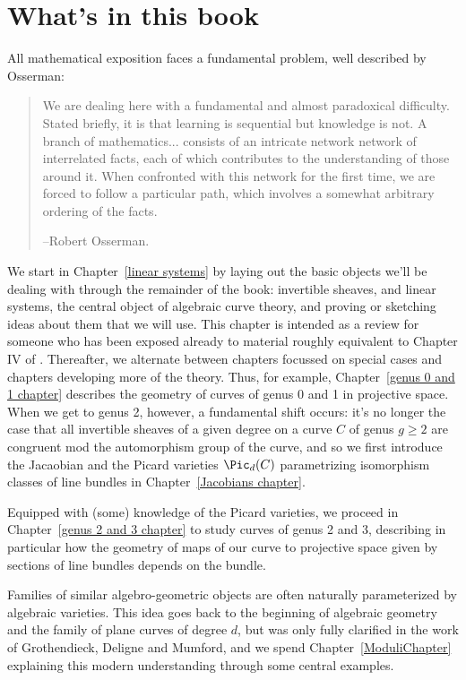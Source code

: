 \section{What's in this book}
All mathematical exposition faces a fundamental problem, well described by Osserman:
\begin{quote}
\small\sf
We are dealing here with a fundamental and almost paradoxical difficulty. Stated briefly, it is that learning is sequential but knowledge is not. A branch of mathematics... consists of an intricate network network of interrelated facts, each of which contributes to the understanding of those around it. When confronted with this network for the first time, we are forced to follow a particular path, which involves a somewhat arbitrary ordering of the facts.

--Robert Osserman.

\end{quote}

We start in Chapter~\ref{linear systems} by laying out the basic objects we'll be dealing with through the remainder of the book: invertible sheaves, and linear systems, the central object of algebraic curve theory, and proving or sketching ideas about them that we will use. This chapter is intended as a review for someone who has been exposed already to material roughly equivalent to Chapter IV of \cite{H}. Thereafter, we alternate between chapters focussed on special cases and chapters developing more of the theory. Thus, for example, Chapter~\ref{genus 0 and 1 chapter} describes the geometry of curves of genus 0 and 1 in projective space. When we get to genus 2, however, a fundamental shift occurs: it's no longer the case that all invertible sheaves of a given degree on a curve $C$ of genus $g \geq 2$ are congruent mod the automorphism group of the curve, and so we first introduce the Jacaobian and the Picard varieties $\Pic_d(C)$ parametrizing isomorphism classes of line bundles in Chapter~\ref{Jacobians chapter}.

Equipped with (some) knowledge of the Picard varieties, we proceed in Chapter~\ref{genus 2 and 3 chapter} to study curves of genus 2 and 3, describing in particular how the geometry of maps of our curve to projective space given by sections of line bundles depends on the bundle. 

Families of similar algebro-geometric objects are often naturally parameterized by algebraic varieties. This idea goes back to the beginning of algebraic geometry and the family of plane curves of degree $d$, but was only fully clarified in the work of Grothendieck, Deligne and Mumford, and we spend Chapter~\ref{ModuliChapter} explaining this modern understanding through some central examples.

